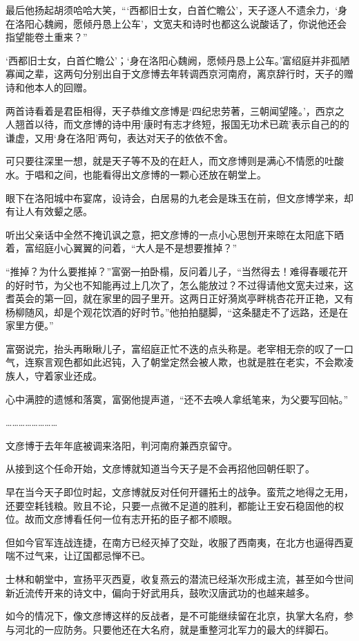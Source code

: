 最后他扬起胡须哈哈大笑，“‘西都旧士女，白首伫瞻公’，天子逐人不遗余力，‘身在洛阳心魏阙，愿倾丹恳上公车’，文宽夫和诗时也都这么说酸话了，你说他还会指望能卷土重来？”

‘西都旧士女，白首伫瞻公’；‘身在洛阳心魏阙，愿倾丹恳上公车。’富绍庭并非孤陋寡闻之辈，这两句分别出自于文彦博去年转调西京河南府，离京辞行时，天子的赠诗和他本人的回赠。

两首诗看着是君臣相得，天子恭维文彦博是‘四纪忠劳著，三朝闻望隆。’，西京之人翘首以待，而文彦博的诗中用‘康时有志才终短，报国无功术已疏’表示自己的的谦虚，又用‘身在洛阳’两句，表达对天子的依依不舍。

可只要往深里一想，就是天子等不及的在赶人，而文彦博则是满心不情愿的吐酸水。于唱和之间，也能看得出文彦博的一颗心还放在朝堂上。

眼下在洛阳城中布宴席，设诗会，白居易的九老会是珠玉在前，但文彦博学来，却有让人有效颦之感。

听出父亲话中全然不掩讥讽之意，把文彦博的一点小心思刨开来晾在太阳底下晒着，富绍庭小心翼翼的问着，“大人是不是想要推掉？”

“推掉？为什么要推掉？”富弼一拍卧榻，反问着儿子，“当然得去！难得春暖花开的好时节，为父也不知能再过上几次了，怎么能放过？不过得请他文宽夫过来，这耆英会的第一回，就在家里的园子里开。这两日正好漪岚亭畔桃杏花开正艳，又有杨柳随风，却是个观花饮酒的好时节。”他拍拍腿脚，“这条腿走不了远路，还是在家里方便。”

富弼说完，抬头再瞅瞅儿子，富绍庭正忙不迭的点头称是。老宰相无奈的叹了一口气，连察言观色都如此迟钝，入了朝堂定然会被人欺，也就是胜在老实，不会欺凌族人，守着家业还成。

心中满腔的遗憾和落寞，富弼他提声道，“还不去唤人拿纸笔来，为父要写回帖。”

……………………

文彦博于去年年底被调来洛阳，判河南府兼西京留守。

从接到这个任命开始，文彦博就知道当今天子是不会再招他回朝任职了。

早在当今天子即位时起，文彦博就反对任何开疆拓土的战争。蛮荒之地得之无用，还要空耗钱粮。败且不论，只要一点微不足道的胜利，都能让王安石稳固他的权位。故而文彦博看任何一位有志开拓的臣子都不顺眼。

但如今官军连战连捷，在南方已经灭掉了交趾，收服了西南夷，在北方也逼得西夏喘不过气来，让辽国都忌惮不已。

士林和朝堂中，宣扬平灭西夏，收复燕云的潜流已经渐次形成主流，甚至如今世间新近流传开来的诗文中，偏向于好武用兵，鼓吹汉唐武功的也越来越多。

如今的情况下，像文彦博这样的反战者，是不可能继续留在北京，执掌大名府，参与河北的一应防务。只要他还在大名府，就是重整河北军力的最大的绊脚石。

